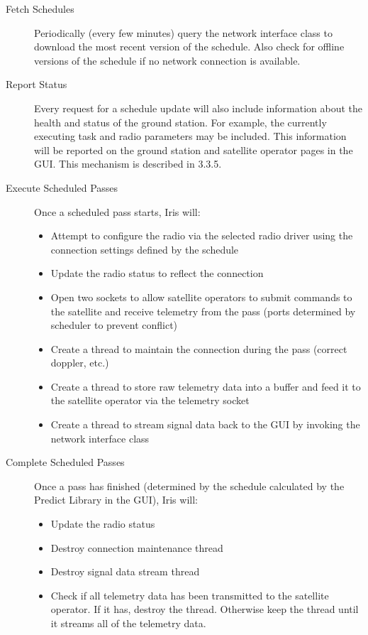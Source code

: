 \documentclass{mxl-note}
\begin{document}
\begin{description}
	\item [Fetch Schedules] Periodically (every few minutes) query the network interface class to download the most recent version of the schedule. Also check for offline versions of the schedule if no network connection is available.
	\item [Report Status] Every request for a schedule update will also include information about the health and status of the ground station. For example, the currently executing task and radio parameters may be included. This information will be reported on the ground station and satellite operator pages in the GUI. This mechanism is described in 3.3.5.
	\item [Execute Scheduled Passes] Once a scheduled pass starts, Iris will:
		\begin{itemize}
			\item Attempt to configure the radio via the selected radio driver using the connection settings defined by the schedule
			\item Update the radio status to reflect the connection
			\item Open two sockets to allow satellite operators to submit commands to the satellite and receive telemetry from the pass (ports determined by scheduler to prevent conflict)
			\item Create a thread to maintain the connection during the pass (correct doppler, etc.)
			\item Create a thread to store raw telemetry data into a buffer and feed it to the satellite operator via the telemetry socket
			\item Create a thread to stream signal data back to the GUI by invoking the network interface class
		\end{itemize}
	\item [Complete Scheduled Passes] Once a pass has finished (determined by the schedule calculated by the Predict Library in the GUI), Iris will:
		\begin{itemize}
			\item Update the radio status
			\item Destroy connection maintenance thread 
			\item Destroy signal data stream thread
			\item Check if all telemetry data has been transmitted to the satellite operator. If it has, destroy the thread. Otherwise keep the thread until it streams all of the telemetry data.
		\end{itemize}
\end{description}
\end{document}
